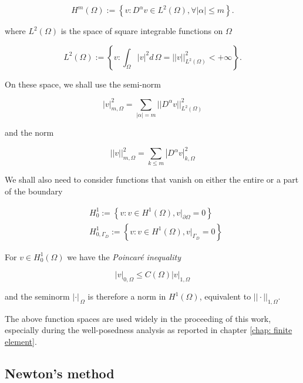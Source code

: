 \begin{equation}
\label{space: Hm}
H^m(\Omega) := \left\{ v : D^{\alpha}v\in L^2(\Omega),\forall |\alpha|\leq m \right\}.
\end{equation}

where $L^2(\Omega)$ is the space of square integrable functions on $\Omega$

\begin{equation}
\label{space: L2}
L^2(\Omega) := \left\{ v : \int_{\Omega} |v|^2 d\,\Omega =||v||^2_{L^2(\Omega)}<+\infty \right\}.
\end{equation}

On these space, we shall use the semi-norm

\begin{equation}
\label{eq: semiorm sobolev}
|v|_{m,\Omega}^2 = \sum_{|\alpha|=m} ||D^{\alpha}v||^2_{L^2(\Omega)}
\end{equation}

and the norm

\begin{equation}
\label{eq: norm sobolev}
||v||_{m,\Omega}^2 = \sum_{k\leq m} |D^{\alpha}v|^2_{k,\Omega}
\end{equation}

We shall also need to consider functions that vanish on either the entire or a part of the boundary

\begin{align}
& H^1_0 :=  \left\{   v : v \in H^1(\Omega), v|_{\partial \Omega} = 0\right\} \label{space: h1 zero} \\
& H^1_{0,\Gamma_D} :=  \left\{   v : v \in H^1(\Omega), v|_{\Gamma_D} = 0\right\} \label{space: h1 zero gamma}
\end{align} 

For $v \in H^1_0(\Omega)$ we have the \textit{Poincar\'e inequality}

\begin{equation}
\label{eq: poincarre inequality}
|v|_{0,\Omega} \leq C(\Omega) |v|_{1,\Omega}
\end{equation}

and the seminorm $|\cdot |_{\,\Omega}$ is therefore a norm in $H^1(\Omega)$, equivalent to $||\cdot ||_{1,\Omega}$.

The above function spaces are used widely in the proceeding of this work, especially during the well-posedness analysis as reported in chapter \ref{chap: finite element}.


\subsection{Newton's method}

